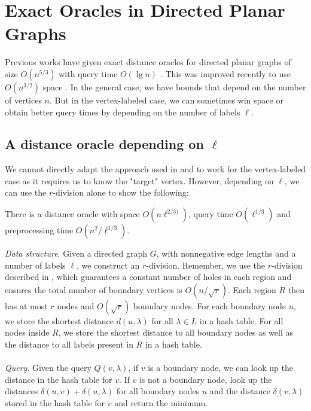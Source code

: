 \section{Exact Oracles in Directed Planar Graphs}\label{exactPlanar}

Previous works have given exact distance oracles for directed planar graphs of size
$O(n^{5/3})$ with query time $O(\lg n)$ \cite{cohen2017fast}. This was improved recently
to use $O(n^{3/2})$ space \cite{gawrychowski2017better}. In the general case, we have
bounds that depend on the number of vertices $n$. But in the vertex-labeled case, we can
sometimes win space or obtain better query times by depending on the number of labels $\ell$.

\subsection{A distance oracle depending on $\ell$}
We cannot directly adapt the approach used in \cite{cohen2017fast} and \cite{gawrychowski2017better} to work
for the vertex-labeled case as it requires us to know the "target" vertex. However,
depending on $\ell$, we can use the $r$-division alone to show the following:
\begin{thm}\label{thm1}
  There is a distance oracle with space $O(n\ell^{2/3)})$, query time $O(\ell^{1/3})$ and
  preprocessing time $O(n^2/\ell^{1/3})$.
\end{thm}
\textit{Data structure}. Given a directed graph $G$, with nonnegative edge lengths and a number of labels $\ell$, we
construct an $r$-division. Remember, we use the $r$-division described in
\cite{klein2013structured}, which guarantees a constant number of holes in each region
and ensures the total number of boundary vertices is $O(n/\sqrt{r})$. Each region $R$ then has at most $r$ nodes and $O(\sqrt{r})$
boundary nodes. For each boundary node $u$, we store the shortest distance $d(u,\lambda)$
for all $\lambda \in L$ in a hash table. For all nodes inside $R$, we store the shortest
distance to all
boundary nodes as well as the distance to all labels present in $R$ in a hash table. \\
\\
\indent \textit{Query}. Given the query $Q(v, \lambda)$, if $v$ is a boundary node, we can look
up the distance in the hash table for $v$. If $v$ is not a boundary node, look up the
distances $\delta(u,v)+\delta(u,\lambda)$ for all boundary nodes $u$ and the distance
$\delta(v,\lambda)$ stored in the hash table for $v$ and return the minimum.

